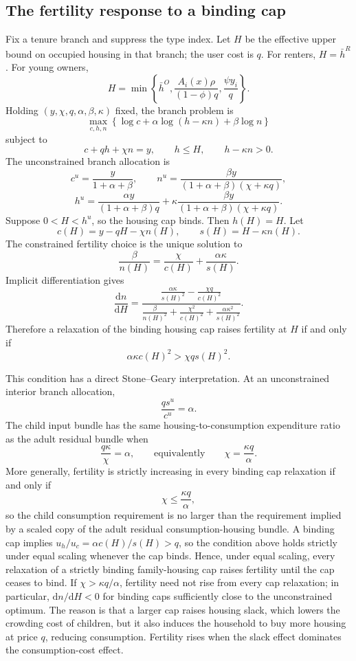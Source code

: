 \documentclass[11pt]{article}
\newcommand{\dd}{\mathrm d}
\newcommand{\1}{\mathbf 1}
\begin{document}
\subsection{The fertility response to a binding cap}

Fix a tenure branch and suppress the type index. Let $H$ be the effective upper bound on occupied housing in that branch; the user cost is $q$. For renters, $H=\bar h^R$. For young owners,
\[
H=
\min\left\{
\bar h^O,
\frac{A_i(x)\rho}{(1-\phi)q},
\frac{\psi y_i}{q}
\right\}.
\]
Holding $(y,\chi,q,\alpha,\beta,\kappa)$ fixed, the branch problem is
\[
\max_{c,h,n}
\left\{
\log c+\alpha\log(h-\kappa n)+\beta\log n
\right\}
\]
subject to
\[
c+qh+\chi n=y,
\qquad
h\le H,
\qquad
h-\kappa n>0.
\]
The unconstrained branch allocation is
\[
c^u=\frac{y}{1+\alpha+\beta},
\qquad
n^u=
\frac{\beta y}{(1+\alpha+\beta)(\chi+\kappa q)},
\]
\[
h^u=
\frac{\alpha y}{(1+\alpha+\beta)q}
+
\kappa
\frac{\beta y}{(1+\alpha+\beta)(\chi+\kappa q)}.
\]
Suppose $0<H<h^u$, so the housing cap binds. Then $h(H)=H$. Let
\[
c(H)=y-qH-\chi n(H),
\qquad
s(H)=H-\kappa n(H).
\]
The constrained fertility choice is the unique solution to
\[
\frac{\beta}{n(H)}
=
\frac{\chi}{c(H)}
+
\frac{\alpha\kappa}{s(H)}.
\]
Implicit differentiation gives
\[
\frac{\dd n}{\dd H}
=
\frac{
\frac{\alpha\kappa}{s(H)^2}
-
\frac{\chi q}{c(H)^2}
}{
\frac{\beta}{n(H)^2}
+
\frac{\chi^2}{c(H)^2}
+
\frac{\alpha\kappa^2}{s(H)^2}
}.
\]
Therefore a relaxation of the binding housing cap raises fertility at $H$ if and only if
\[
\alpha\kappa c(H)^2>\chi q s(H)^2.
\]

This condition has a direct Stone--Geary interpretation. At an unconstrained interior branch allocation,
\[
\frac{q s^u}{c^u}=\alpha.
\]
The child input bundle has the same housing-to-consumption expenditure ratio as the adult residual bundle when
\[
\frac{q\kappa}{\chi}=\alpha,
\qquad\text{equivalently}\qquad
\chi=\frac{\kappa q}{\alpha}.
\]
More generally, fertility is strictly increasing in every binding cap relaxation if and only if
\[
\chi\le \frac{\kappa q}{\alpha},
\]
so the child consumption requirement is no larger than the requirement implied by a scaled copy of the adult residual consumption-housing bundle. A binding cap implies $u_h/u_c=\alpha c(H)/s(H)>q$, so the condition above holds strictly under equal scaling whenever the cap binds. Hence, under equal scaling, every relaxation of a strictly binding family-housing cap raises fertility until the cap ceases to bind. If $\chi>\kappa q/\alpha$, fertility need not rise from every cap relaxation; in particular, $\dd n/\dd H<0$ for binding caps sufficiently close to the unconstrained optimum. The reason is that a larger cap raises housing slack, which lowers the crowding cost of children, but it also induces the household to buy more housing at price $q$, reducing consumption. Fertility rises when the slack effect dominates the consumption-cost effect.
\end{document}

